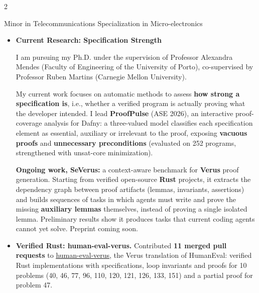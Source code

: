 \documentclass[10pt,a4paper,ragged2e,withhyper]{altacv}
\begin{document}
\begin{paracol}{2}

Minor in Telecommunications 
Specialization in Micro-electronics

\divider




\newpage

\begin{itemize}
 \item \textbf{Current Research: Specification Strength}

I am pursuing my Ph.D. under the supervision of Professor Alexandra Mendes (Faculty of Engineering of the University of Porto), co-supervised by Professor Ruben Martins (Carnegie Mellon University).

My current work focuses on automatic methods to assess \textbf{how strong a specification is}, i.e., whether a verified program is actually proving what the developer intended. I lead \textbf{ProofPulse} (ASE 2026), an interactive proof-coverage analysis for Dafny: a three-valued model classifies each specification element as essential, auxiliary or irrelevant to the proof, exposing \textbf{vacuous proofs} and \textbf{unnecessary preconditions} (evaluated on 252 programs, strengthened with unsat-core minimization).

\textbf{Ongoing work, SeVerus:} a context-aware benchmark for \textbf{Verus} proof generation. Starting from verified open-source \textbf{Rust} projects, it extracts the dependency graph between proof artifacts (lemmas, invariants, assertions) and builds sequences of tasks in which agents must write and prove the missing \textbf{auxiliary lemmas} themselves, instead of proving a single isolated lemma. Preliminary results show it produces tasks that current coding agents cannot yet solve. Preprint coming soon.

 \item \textbf{Verified Rust: human-eval-verus.} Contributed \textbf{11 merged pull requests} to \underline{\href{https://github.com/secure-foundations/human-eval-verus}{human-eval-verus}}, the Verus translation of HumanEval: verified Rust implementations with specifications, loop invariants and proofs for 10 problems (40, 46, 77, 96, 110, 120, 121, 126, 133, 151) and a partial proof for problem 47.


\end{itemize}
\end{paracol}
\end{document}
